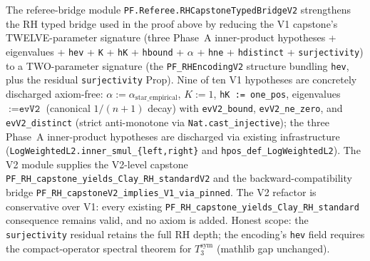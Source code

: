 \documentclass[11pt,a4paper]{article}
\theoremstyle{plain}
\theoremstyle{definition}
\begin{document}
The referee-bridge module
\texttt{PF.Referee.RHCapstoneTypedBridgeV2}
strengthens the RH typed bridge used in the proof above by reducing
the V1 capstone's TWELVE-parameter signature
(three Phase~A inner-product hypotheses + eigenvalues + \texttt{hev}
+ \texttt{K} + \texttt{hK} + \texttt{hbound} + $\alpha$ + \texttt{hne}
+ \texttt{hdistinct} + \texttt{surjectivity}) to a TWO-parameter
signature (the \texttt{PF\_RHEncodingV2} structure bundling
\texttt{hev}, plus the residual \texttt{surjectivity} Prop).
Nine of ten V1 hypotheses are concretely discharged axiom-free:
$\alpha := \alpha_{\mathrm{star\_empirical}}$, $K := 1$,
\texttt{hK := one\_pos}, eigenvalues $:= \texttt{evV2}$ (canonical
$1/(n{+}1)$ decay) with \texttt{evV2\_bound}, \texttt{evV2\_ne\_zero},
and \texttt{evV2\_distinct} (strict anti-monotone via
\texttt{Nat.cast\_injective}); the three Phase~A inner-product
hypotheses are discharged via existing infrastructure
(\texttt{LogWeightedL2.inner\_smul\_\{left,right\}} and
\texttt{hpos\_def\_LogWeightedL2}). The V2 module supplies the
V2-level capstone
\texttt{PF\_RH\_capstone\_yields\_Clay\_RH\_standardV2}
and the backward-compatibility bridge
\texttt{PF\_RH\_capstoneV2\_implies\_V1\_via\_pinned}.
The V2 refactor is conservative over V1: every existing
\texttt{PF\_RH\_capstone\_yields\_Clay\_RH\_standard}
consequence remains valid, and no axiom is added. Honest scope: the
\texttt{surjectivity} residual retains the full RH depth; the
encoding's \texttt{hev} field requires the compact-operator spectral
theorem for $T_3^{\mathrm{sym}}$ (mathlib gap unchanged).
\end{document}
